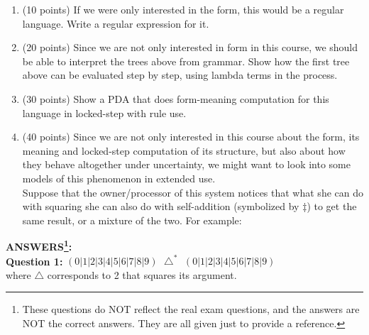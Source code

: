 \documentclass[12pt,a4paper]{article}
\begin{document}
\begin{enumerate}
\item (10 points) If we were only interested in the form, this would be a regular language. Write a regular expression for it.
\item (20 points) Since we are not only interested in form in this course, we should be able to interpret the trees above from grammar. Show how the first tree above can be evaluated step by step, using lambda terms in the process.
\item  (30 points) Show a PDA that does form-meaning computation for this language in locked-step with rule use.
\item (40 points) Since we are not only interested in this course about the form, its meaning and locked-step computation of its structure, but also about how they behave altogether under uncertainty, we might want to look into some models of this phenomenon in extended use.\\
Suppose that the owner/processor of this system notices that what she can do with squaring she can also do with self-addition (symbolized by $\ddagger$) to get the same result, or a mixture of the two. For example:
\end{enumerate}
\hspace{3cm}
\clearpage

\noindent \textbf{ANSWERS\footnote{These questions do NOT reflect the real exam questions, and the answers are NOT the correct answers. They are all given just to provide a reference.}:}\\
\noindent \textbf{Question 1:} $(0|1|2|3|4|5|6|7|8|9)$ $ \bigtriangleup^{*} $ $(0|1|2|3|4|5|6|7|8|9)$\\ where $\bigtriangleup$ corresponds to 2 that squares its argument.\\
\end{document}
